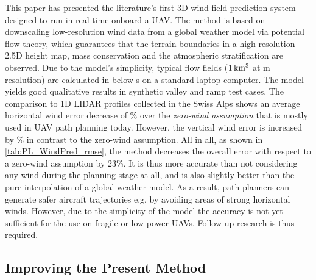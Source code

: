 \documentclass[twocolumn,letterpaper]{IEEEAerospaceCLS}
\begin{document}
This paper has presented the literature's first 3D wind field prediction system designed to run in real-time onboard a UAV. The method is based on downscaling low-resolution wind data from a global weather model via potential flow theory, which guarantees that the terrain boundaries in a high-resolution 2.5D height map, mass conservation and the atmospheric stratification are observed. Due to the model's simplicity, typical flow fields ($\unit[1]{km^3}$ at \unit[25]{m} resolution) are calculated in below \unit[10]{s} on a standard laptop computer. The model yields good qualitative results in synthetic valley and ramp test cases. The comparison to 1D LIDAR profiles collected in the Swiss Alps shows an average horizontal wind error decrease of \unit[41]{\%} over the \emph{zero-wind assumption} that is mostly used in UAV path planning today. However, the vertical wind error is increased by \unit[26]{\%} in contrast to the zero-wind assumption. All in all, as shown in \cref{tab:PL_WindPred_rmse}, the method decreases the overall error with respect to a zero-wind assumption by 23\%. It is thus more accurate than not considering any wind during the planning stage at all, and is also slightly better than the pure interpolation of a global weather model. As a result, path planners can generate safer aircraft trajectories e.g. by avoiding areas of strong horizontal winds. However, due to the simplicity of the model the accuracy is not yet sufficient for the use on fragile or low-power UAVs. Follow-up research is thus required.

\subsection{Improving the Present Method}
\end{document}
